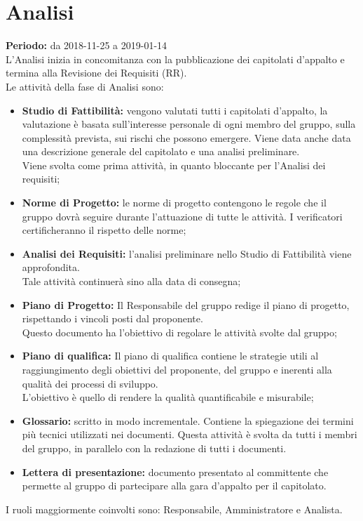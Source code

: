 \section{Analisi}
\textbf{Periodo:} da 2018-11-25 a 2019-01-14\\L'Analisi inizia in concomitanza con la pubblicazione dei capitolati d’appalto e termina alla Revisione dei Requisiti (RR).\\
Le attività della fase di Analisi sono:
\begin{itemize}
    \item \textbf{Studio di Fattibilità:} vengono valutati tutti i capitolati d'appalto, la valutazione è basata sull'interesse personale di ogni membro del gruppo, sulla complessità prevista, sui rischi che possono emergere. Viene data anche data una descrizione generale del capitolato e una analisi preliminare.\\Viene svolta come prima attività, in quanto bloccante per l'Analisi dei requisiti;
    \item \textbf{Norme di Progetto:} le norme di progetto contengono le regole che il gruppo dovrà seguire durante l'attuazione di tutte le attività. I verificatori certificheranno il rispetto delle norme;
    \item \textbf{Analisi dei Requisiti:} l'analisi preliminare nello Studio di Fattibilità viene approfondita.\\Tale attività continuerà sino alla data di consegna;
    \item \textbf{Piano di Progetto:} Il Responsabile del gruppo redige il piano di progetto, rispettando i vincoli posti dal proponente.\\Questo documento ha l'obiettivo di regolare le attività svolte dal gruppo;
    \item \textbf{Piano di qualifica:} Il piano di qualifica contiene le strategie utili al raggiungimento degli obiettivi del proponente, del gruppo e inerenti alla qualità dei processi di sviluppo.\\L'obiettivo è quello di rendere la qualità quantificabile e misurabile;
    \item \textbf{Glossario:} scritto in modo incrementale. Contiene la spiegazione dei termini più tecnici utilizzati nei documenti. Questa attività è svolta da tutti i membri del gruppo, in parallelo con la redazione di tutti i documenti.
    \item \textbf{Lettera di presentazione:} documento presentato al committente che permette al gruppo di partecipare alla gara d’appalto per il capitolato.
\end{itemize}
I ruoli maggiormente coinvolti sono: Responsabile, Amministratore e Analista.
